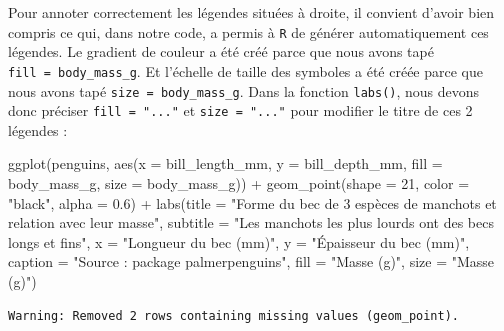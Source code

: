 \documentclass[
  letterpaper,
  DIV=11,
  numbers=noendperiod]{scrreprt}
\newenvironment{Shaded}{\begin{snugshade}}{\end{snugshade}}
\newcommand{\AttributeTok}[1]{\textcolor[rgb]{0.40,0.45,0.13}{#1}}
\newcommand{\DecValTok}[1]{\textcolor[rgb]{0.68,0.00,0.00}{#1}}
\newcommand{\FloatTok}[1]{\textcolor[rgb]{0.68,0.00,0.00}{#1}}
\newcommand{\FunctionTok}[1]{\textcolor[rgb]{0.28,0.35,0.67}{#1}}
\newcommand{\NormalTok}[1]{\textcolor[rgb]{0.00,0.23,0.31}{#1}}
\newcommand{\SpecialCharTok}[1]{\textcolor[rgb]{0.37,0.37,0.37}{#1}}
\newcommand{\StringTok}[1]{\textcolor[rgb]{0.13,0.47,0.30}{#1}}
\begin{document}
Pour annoter correctement les légendes situées à droite, il convient
d'avoir bien compris ce qui, dans notre code, a permis à \texttt{R} de
générer automatiquement ces légendes. Le gradient de couleur a été créé
parce que nous avons tapé \texttt{fill\ =\ body\_mass\_g}. Et l'échelle
de taille des symboles a été créée parce que nous avons tapé
\texttt{size\ =\ body\_mass\_g}. Dans la fonction \texttt{labs()}, nous
devons donc préciser \texttt{fill\ =\ "..."} et \texttt{size\ =\ "..."}
pour modifier le titre de ces 2 légendes :

\begin{Shaded}
\begin{Highlighting}[]
\FunctionTok{ggplot}\NormalTok{(penguins, }\FunctionTok{aes}\NormalTok{(}\AttributeTok{x =}\NormalTok{ bill\_length\_mm, }\AttributeTok{y =}\NormalTok{ bill\_depth\_mm,}
                     \AttributeTok{fill =}\NormalTok{ body\_mass\_g, }\AttributeTok{size =}\NormalTok{ body\_mass\_g)) }\SpecialCharTok{+}
  \FunctionTok{geom\_point}\NormalTok{(}\AttributeTok{shape =} \DecValTok{21}\NormalTok{, }\AttributeTok{color =} \StringTok{"black"}\NormalTok{, }\AttributeTok{alpha =} \FloatTok{0.6}\NormalTok{) }\SpecialCharTok{+}
  \FunctionTok{labs}\NormalTok{(}\AttributeTok{title =} \StringTok{"Forme du bec de 3 espèces de manchots et relation avec leur masse"}\NormalTok{,}
       \AttributeTok{subtitle =} \StringTok{"Les manchots les plus lourds ont des becs longs et fins"}\NormalTok{,}
       \AttributeTok{x =} \StringTok{"Longueur du bec (mm)"}\NormalTok{,}
       \AttributeTok{y =} \StringTok{"Épaisseur du bec (mm)"}\NormalTok{,}
       \AttributeTok{caption =} \StringTok{"Source :  package \textquotesingle{}palmerpenguins\textquotesingle{}"}\NormalTok{,}
       \AttributeTok{fill =} \StringTok{"Masse (g)"}\NormalTok{,}
       \AttributeTok{size =} \StringTok{"Masse (g)"}\NormalTok{)}
\end{Highlighting}
\end{Shaded}

\begin{verbatim}
Warning: Removed 2 rows containing missing values (geom_point).
\end{verbatim}
\end{document}
